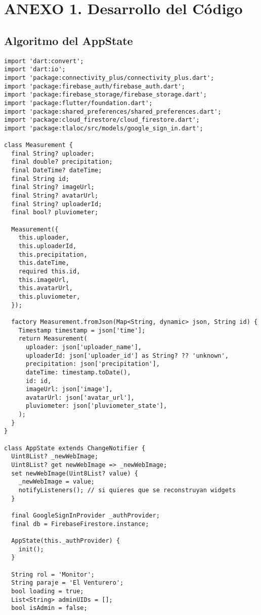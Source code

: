 \chapter{ANEXO 1. Desarrollo del Código}

\section{Algoritmo del AppState}
\label{anexo:alg1}

\begin{verbatim}
import 'dart:convert';
import 'dart:io';
import 'package:connectivity_plus/connectivity_plus.dart';
import 'package:firebase_auth/firebase_auth.dart';
import 'package:firebase_storage/firebase_storage.dart';
import 'package:flutter/foundation.dart';
import 'package:shared_preferences/shared_preferences.dart';
import 'package:cloud_firestore/cloud_firestore.dart';
import 'package:tlaloc/src/models/google_sign_in.dart';

class Measurement {
  final String? uploader;
  final double? precipitation;
  final DateTime? dateTime;
  final String id;
  final String? imageUrl;
  final String? avatarUrl;
  final String? uploaderId;
  final bool? pluviometer;

  Measurement({
    this.uploader,
    this.uploaderId,
    this.precipitation,
    this.dateTime,
    required this.id,
    this.imageUrl,
    this.avatarUrl,
    this.pluviometer,
  });

  factory Measurement.fromJson(Map<String, dynamic> json, String id) {
    Timestamp timestamp = json['time'];
    return Measurement(
      uploader: json['uploader_name'],
      uploaderId: json['uploader_id'] as String? ?? 'unknown',
      precipitation: json['precipitation'],
      dateTime: timestamp.toDate(),
      id: id,
      imageUrl: json['image'],
      avatarUrl: json['avatar_url'],
      pluviometer: json['pluviometer_state'],
    );
  }
}

class AppState extends ChangeNotifier {
  Uint8List? _newWebImage;
  Uint8List? get newWebImage => _newWebImage;
  set newWebImage(Uint8List? value) {
    _newWebImage = value;
    notifyListeners(); // si quieres que se reconstruyan widgets
  }

  final GoogleSignInProvider _authProvider;
  final db = FirebaseFirestore.instance;

  AppState(this._authProvider) {
    init();
  }

  String rol = 'Monitor';
  String paraje = 'El Venturero';
  bool loading = true;
  List<String> adminUIDs = [];
  bool isAdmin = false;


\end{verbatim}
